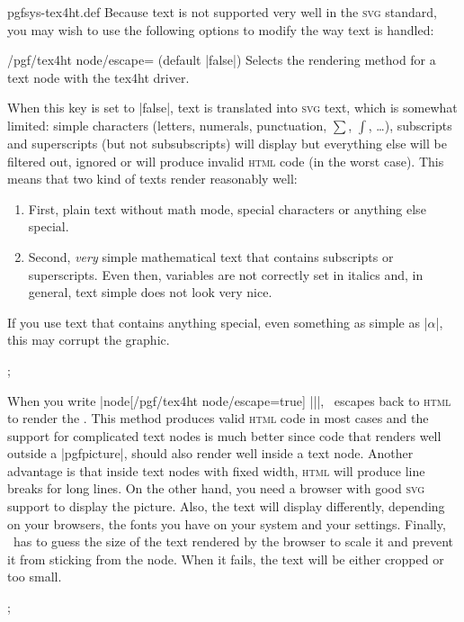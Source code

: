 \begin{filedescription}{pgfsys-tex4ht.def}
    Because text is not supported very well in the \textsc{svg} standard, you
    may wish to use the following options to modify the way text is handled:

    \begin{key}{/pgf/tex4ht node/escape= (default |false|)}
        Selects the rendering method for a text node with the tex4ht driver.

        When this key is set to |false|, text is translated into \textsc{svg}
        text, which is somewhat limited: simple characters (letters, numerals,
        punctuation, $\sum$, $\int$, \ldots), subscripts and superscripts (but
        not subsubscripts) will display but everything else will be filtered
        out, ignored or will produce invalid \textsc{html} code (in the worst
        case). This means that two kind of texts render reasonably well:
        \begin{enumerate}
            \item First, plain text without math mode, special characters or
                anything else special.
            \item Second, \emph{very} simple mathematical text that contains
                subscripts or superscripts. Even then, variables are not
                correctly set in italics and, in general, text simple does
                not look very nice.
        \end{enumerate}
        If you use text that contains anything special, even something as
        simple as |$\alpha$|, this may corrupt the graphic.
\begin{codeexample}
\tikz {};
\end{codeexample}

    When you write |node[/pgf/tex4ht node/escape=true] {||}|,
    \pgfname\ escapes back to \textsc{html} to render the . This
    method produces valid \textsc{html} code in most cases and the support for
    complicated text nodes is much better since code that renders well outside
    a |{pgfpicture}|, should also render well inside a text node. Another
    advantage is that inside text nodes with fixed width, \textsc{html} will
    produce line breaks for long lines. On the other hand, you need a browser
    with good \textsc{svg} support to display the picture. Also, the text will
    display differently, depending on your browsers, the fonts you have on your
    system and your settings. Finally, \pgfname\ has to guess the size of the
    text rendered by the browser to scale it and prevent it from sticking from
    the node. When it fails, the text will be either cropped or too small.
\begin{codeexample}
\tikz {};
\end{codeexample}
    \end{key}


\end{filedescription}
